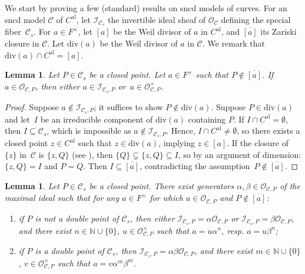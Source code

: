 \documentclass[JEP,XML,SOM,Unicode,NoFloatCountersInSection,published]{cedram}
\newcommand{\al}{\mathrm{al}}
\newtheorem{lm}[thm]{Lemma}
\theoremstyle{definition}
\begin{document}
We start by proving a few (standard) results on sncd models of curves. For an sncd model $\mathcal{C}$ of $C^{\al}$, let $\mathcal{I}_{\mathcal{C}_s}$ the invertible ideal sheaf of $\mathcal{O}_{\mathcal{C}}$ defining the special fiber~$\mathcal{C}_s$. For $a \in F^{\times}$, let $[a]$ be the Weil divisor of $a$ in $C^{\al}$, and $\overline{[a]}$ its Zariski closure in $\mathcal{C}$. Let $\mathrm{div}(a)$ be the Weil divisor of $a$ in $\mathcal{C}$. We remark that $\mathrm{div}(a) \cap C^{\al}=[a]$.

\begin{lm} \label{4.2}
Let $P \in \mathcal{C}_s$ be a closed point. Let $a \in F^{\times}$ such that $P \not \in \overline{[a]}$.
If~${a \in \mathcal{O}_{\mathcal{C},P}}$, then either $a \in \mathcal{I}_{\mathcal{C}_s,P}$ or~$a \in \mathcal{O}_{\mathcal{C}, P}^{\times}$.
\end{lm}

\begin{proof}
Suppose $a \not \in \mathcal{I}_{\mathcal{C}_s,P}$; it suffices to show $P \not \in \mathrm{div}(a)$. Suppose $P \in \mathrm{div}(a)$ and let~$I$ be an irreducible component of $\mathrm{div}(a)$ containing $P$. If $I \cap C^{\al} =\emptyset$, then $I \subseteq \mathcal{C}_s$, which is impossible as $a \not \in \mathcal{I}_{\mathcal{C}_s,P}$. Hence, $I \cap C^{\al} \neq \emptyset$, so there exists a closed point $z \in C^{\al}$ such that $z \in \mathrm{div}(a)$, implying $z \in [a]$. If the closure of~$\{z\}$ in~$\mathcal{C}$ is $\{z, Q\}$ (see \cite[Def.\,10.1.31]{liulibri}), then $\{Q\} \subsetneq \{z, Q\} \subseteq I$, so by an argument of dimension: $\{z,Q\}=I$ and $P=Q$. Then $I \subseteq \overline{[a]}$, contradicting the assumption~${P \not \in \overline{[a]}}$.
\end{proof}

\begin{lm} \label{4.3} Let $P \in \mathcal{C}_s$ be a closed point. There exist generators $\alpha, \beta \in \mathcal{O}_{\mathcal{C}, P}$ of the maximal ideal such that for any $a \in F^{\times}$ for which $a \in \mathcal{O}_{\mathcal{C},P}$ and $P \not \in \overline{[a]}$:
\begin{enumerate}
\item\label{4.31} if $P$ is not a double point of $\mathcal{C}_s$, then either $\mathcal{I}_{\mathcal{C}_s,P}=\alpha \mathcal{O}_{\mathcal{C}, P}$ or $\mathcal{I}_{\mathcal{C}_s,P}=\beta \mathcal{O}_{\mathcal{C}, P}$, and there exist ${n \in \mathbb{N} \cup \{0\}}$, $u \in \mathcal{O}_{\mathcal{C}, P}^{\times}$ such that $a=u\alpha^n$, resp. $a=u \beta^n$;
\item\label{4.32} if $P$ is a double point of $\mathcal{C}_s$, then $\mathcal{I}_{\mathcal{C}_s,P}=\alpha\beta \mathcal{O}_{\mathcal{C}, P}$, and there exist ${m \in \mathbb{N} \cup \{0\}}$, $v \in \mathcal{O}_{\mathcal{C}, P}^{\times}$ such that $a=v\alpha^m \beta^m$.
\end{enumerate}
\end{lm}
\end{document}
